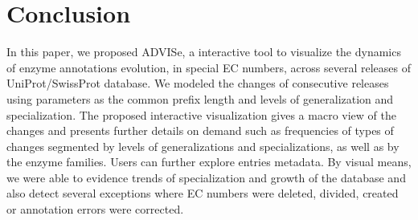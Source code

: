 \section{Conclusion}
\label{sec:conclusion}

In this paper, we proposed ADVISe, a interactive tool to visualize the dynamics of enzyme annotations evolution, in special EC numbers, across several releases of UniProt/SwissProt database. We modeled the changes of consecutive releases using parameters as the common prefix length and levels of generalization and specialization. The proposed interactive visualization gives a macro view of the changes and presents further details on demand such as frequencies of types of changes segmented by levels of generalizations and specializations, as well as by the enzyme families. Users can further explore entries metadata. By visual means, we were able to evidence trends of specialization and growth of the database and also detect several exceptions where EC numbers were deleted, divided, created or annotation errors were corrected.
